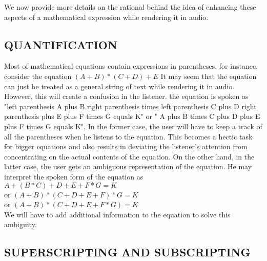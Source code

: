 \documentclass{article}
\begin{document}
  
We now provide more details on the rational behind the idea of enhancing these aspects of a mathematical expression while rendering it in audio.

\subsection{QUANTIFICATION}
\label{ssec:quantify}

Most of mathematical equations contain expressions in parentheses. for instance, consider the equation
$(A+B)*(C+D)+E$
It may seem that the equation can just be treated as a general string of text while rendering it in audio. However, this will create a confusion in the listener. the equation is spoken as "left parenthesis A plus B right parenthesis times left parenthesis C plus D right parenthesis plus E plus F times G equals K" or " A plus B times C plus D plus E plus F times G equals K". In the former case, the user will have to keep a track of all the parentheses when he listens to the equation. This becomes a hectic task for bigger equations and also results in deviating the listener's attention from concentrating on the actual contents of the equation. On the other hand, in the latter
case, the user gets an ambiguous representation of the equation. He may interpret the spoken form of the equation as \\
$A+(B*C)+D+E+F*G = K$ \\ [1ex]
or
$(A+B)*(C+D+E+F)*G = K$ \\ [1ex]
or
$(A+B)*(C+D+E+F*G) = K$\\[1ex]
We will have to add additional information to the equation to solve this ambiguity.


\subsection{SUPERSCRIPTING AND SUBSCRIPTING}
\label{ssec:supsub}
\end{document}
